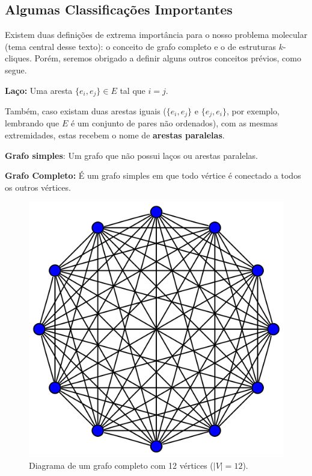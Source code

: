 \documentclass[a4paper,12pt]{article}
\begin{document}
	\subsection{Algumas Classificações Importantes}
	
	Existem duas definições de extrema importância para o nosso problema molecular (tema central desse texto): o conceito de grafo completo e o de estruturas $k$-cliques. Porém, seremos obrigado a definir alguns outros conceitos prévios, como segue. 
	
	
	\begin{center}
		\begin{minipage}{0.9 \linewidth}
			\textbf{Laço:} Uma aresta $\{e_i, e_j\} \in E$ tal que $i = j$.
		\end{minipage}
	\end{center}

	Também, caso existam duas arestas iguais ($\{e_i, e_j\}$ e 
	$\{e_j, e_i\}$, por exemplo, lembrando que $E$ é um conjunto de pares não ordenados), com as mesmas extremidades, estas recebem o nome de \textbf{arestas paralelas}.

	\begin{center}
		\begin{minipage}{0.9 \linewidth}
			\textbf{Grafo simples}: Um grafo que não possui laços ou arestas paralelas.
		\end{minipage}
	\end{center}
	
	\begin{center}
		\begin{minipage}{0.9 \linewidth}
			\textbf{Grafo Completo:} É um grafo simples em que todo vértice é conectado a todos os outros vértices.
		\end{minipage}
	\end{center}

	\begin{figure}[H]
		\begin{center}
			\includegraphics[width=0.4\linewidth]{grafocompleto.png}
		\end{center}
		\caption{Diagrama de um grafo completo com 12 vértices ($|V| = 12$).}
		\label{fig:grafocompleto}
	\end{figure}
	
\end{document}
